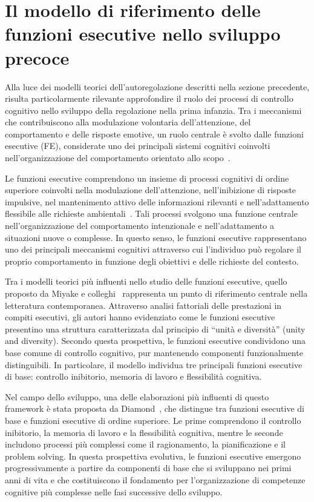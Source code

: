     \section{Il modello di riferimento delle funzioni esecutive nello sviluppo precoce}
    \label{sec:1_4}

        Alla luce dei modelli teorici dell'autoregolazione descritti nella sezione precedente, risulta particolarmente rilevante approfondire il ruolo dei processi di controllo cognitivo nello sviluppo della regolazione nella prima infanzia. Tra i meccanismi che contribuiscono alla modulazione volontaria dell'attenzione, del comportamento e delle risposte emotive, un ruolo centrale è svolto dalle funzioni esecutive (FE), considerate uno dei principali sistemi cognitivi coinvolti nell'organizzazione del comportamento orientato allo scopo~\cite{diamond2013}.

        Le funzioni esecutive comprendono un insieme di processi cognitivi di ordine superiore coinvolti nella modulazione dell'attenzione, nell'inibizione di risposte impulsive, nel mantenimento attivo delle informazioni rilevanti e nell'adattamento flessibile alle richieste ambientali~\cite{diamond2013}. Tali processi svolgono una funzione centrale nell'organizzazione del comportamento intenzionale e nell'adattamento a situazioni nuove o complesse. In questo senso, le funzioni esecutive rappresentano uno dei principali meccanismi cognitivi attraverso cui l'individuo può regolare il proprio comportamento in funzione degli obiettivi e delle richieste del contesto.

        Tra i modelli teorici più influenti nello studio delle funzioni esecutive, quello proposto da Miyake e colleghi~\cite{miyake2000} rappresenta un punto di riferimento centrale nella letteratura contemporanea. Attraverso analisi fattoriali delle prestazioni in compiti esecutivi, gli autori hanno evidenziato come le funzioni esecutive presentino una struttura caratterizzata dal principio di ``unità e diversità'' (unity and diversity). Secondo questa prospettiva, le funzioni esecutive condividono una base comune di controllo cognitivo, pur mantenendo componenti funzionalmente distinguibili. In particolare, il modello individua tre principali funzioni esecutive di base: controllo inibitorio, memoria di lavoro e flessibilità cognitiva.

        Nel campo dello sviluppo, una delle elaborazioni più influenti di questo framework è stata proposta da Diamond~\cite{diamond2013}, che distingue tra funzioni esecutive di base e funzioni esecutive di ordine superiore. Le prime comprendono il controllo inibitorio, la memoria di lavoro e la flessibilità cognitiva, mentre le seconde includono processi più complessi come il ragionamento, la pianificazione e il problem solving. In questa prospettiva evolutiva, le funzioni esecutive emergono progressivamente a partire da componenti di base che si sviluppano nei primi anni di vita e che costituiscono il fondamento per l'organizzazione di competenze cognitive più complesse nelle fasi successive dello sviluppo.

